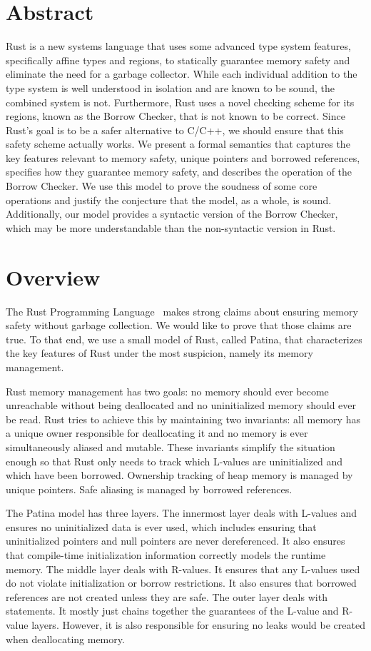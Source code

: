 \section*{Abstract}
Rust is a new systems language that uses some advanced type system features,
specifically affine types and regions, to statically guarantee memory
safety and eliminate the need for a garbage collector.
While each individual addition to the type system is well understood
in isolation and are known to be sound, the combined system is not.
Furthermore, Rust uses a novel checking scheme for its regions, known
as the Borrow Checker, that is not known to be correct.
Since Rust's goal is to be a safer alternative to C/C++, we should
ensure that this safety scheme actually works. We present a formal
semantics that captures the key features relevant to memory safety,
unique pointers and borrowed references, specifies how they guarantee
memory safety, and describes the operation of the Borrow Checker.
We use this model to prove the soudness of some core operations
and justify the conjecture that the model, as a whole, is sound.
Additionally, our model provides a syntactic version of the Borrow
Checker, which may be more understandable than the non-syntactic version
in Rust.

\section*{Overview}
The Rust Programming Language~\cite{rust} makes strong claims about 
ensuring memory safety without garbage collection.
We would like to prove that those claims are true.
To that end, we use a small model of Rust, called Patina, that characterizes the key
features of Rust under the most suspicion, namely its memory management.

Rust memory management has two goals:
no memory should ever become unreachable without being deallocated
and no uninitialized memory should ever be read.
Rust tries to achieve this by maintaining two invariants:
all memory has a unique owner responsible for deallocating it and
no memory is ever simultaneously aliased and mutable.
These invariants simplify the situation enough so that
Rust only needs to track which L-values are uninitialized and which have been borrowed.
Ownership tracking of heap memory is managed by unique pointers.
Safe aliasing is managed by borrowed references.

The Patina model has three layers.
The innermost layer deals with L-values and ensures 
no uninitialized data is ever used, which includes ensuring
that uninitialized pointers and null pointers are never dereferenced.
It also ensures that compile-time initialization information correctly
models the runtime memory.
The middle layer deals with R-values.
It ensures that any L-values used do not violate initialization or borrow restrictions.
It also ensures that borrowed references are not created unless they are safe.
The outer layer deals with statements.
It mostly just chains together the guarantees of the L-value and R-value layers.
However, it is also responsible for ensuring no leaks would be created when deallocating memory.

